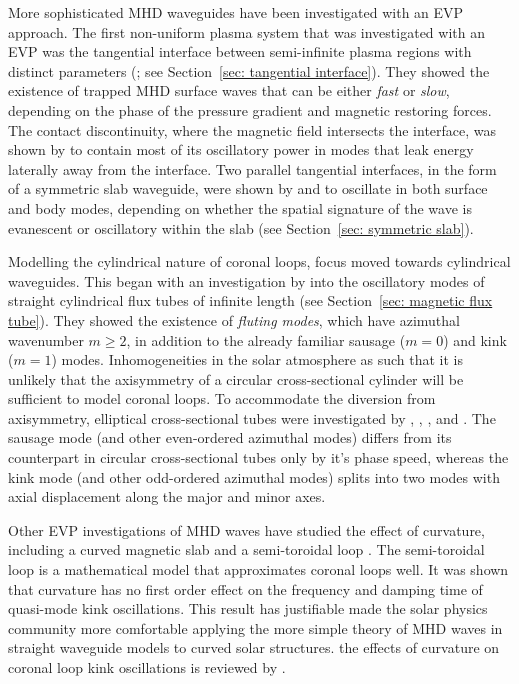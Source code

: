 \documentclass[12pt,draft]{../style-files/ociamthesis}
\begin{document}
More sophisticated MHD waveguides have been investigated with an EVP approach. The first non-uniform plasma system that was investigated with an EVP was the tangential interface between semi-infinite plasma regions with distinct parameters (\citealp{rob81a}; see Section~\ref{sec: tangential interface}). They showed the existence of trapped MHD surface waves that can be either \textit{fast} or \textit{slow}, depending on the phase of the pressure gradient and magnetic restoring forces. The contact discontinuity, where the magnetic field intersects the interface, was shown by \cite{vic_etal18} to contain most of its oscillatory power in modes that leak energy laterally away from the interface. Two parallel tangential interfaces, in the form of a symmetric slab waveguide, were shown by \cite{rob81b} and \cite{edw_etal82} to oscillate in both surface and body modes, depending on whether the spatial signature of the wave is evanescent or oscillatory within the slab (see Section~\ref{sec: symmetric slab}).

Modelling the cylindrical nature of coronal loops, focus moved towards cylindrical waveguides. This began with an investigation by \cite{edw_etal83} into the oscillatory modes of straight cylindrical flux tubes of infinite length (see Section~\ref{sec: magnetic flux tube}). They showed the existence of \textit{fluting modes}, which have azimuthal wavenumber $m \geq 2$, in addition to the already familiar sausage ($m = 0$) and kink ($m = 1$) modes. Inhomogeneities in the solar atmosphere as such that it is unlikely that the axisymmetry of a circular cross-sectional cylinder will be sufficient to model coronal loops. To accommodate the diversion from axisymmetry, elliptical cross-sectional tubes were investigated by \cite{gu_etal80}, \cite{rud03}, \cite{erd_etal09}, and \cite{mor_etal11}. The sausage mode (and other even-ordered azimuthal modes) differs from its counterpart in circular cross-sectional tubes only by it's phase speed, whereas the kink mode (and other odd-ordered azimuthal modes) splits into two modes with axial displacement along the major and minor axes.

Other EVP investigations of MHD waves have studied the effect of curvature, including a curved magnetic slab \citep{ver_etal06a,ver_etal06b} and a semi-toroidal loop \cite{van_etal04}. The semi-toroidal loop is a mathematical model that approximates coronal loops well. It was shown that curvature has no first order effect on the frequency and damping time of quasi-mode kink oscillations. This result has justifiable made the solar physics community more comfortable applying the more simple theory of MHD waves in straight waveguide models to curved solar structures. the effects of curvature on coronal loop kink oscillations is reviewed by \cite{van_etal09}.
\end{document}
